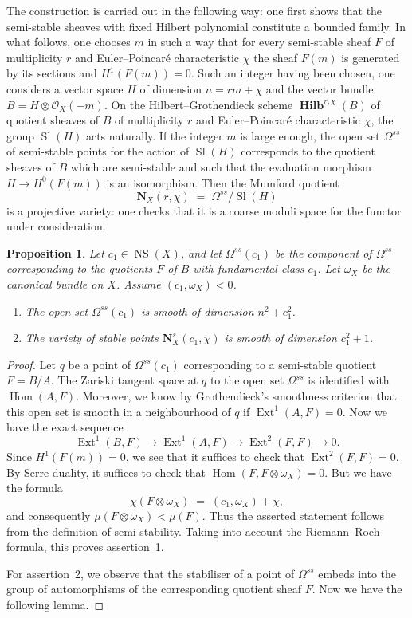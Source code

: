 \documentclass[12pt,english]{smfart}%
\theoremstyle{plain}
\newtheorem{proposition}[theorem]{Proposition}
\theoremstyle{definition}
\theoremstyle{remark}
\newcommand{\Oh}{\mathcal{O}}
\DeclareMathOperator{\Hom}{Hom}
\DeclareMathOperator{\Ext}{Ext}
\DeclareMathOperator{\NS}{NS}
\DeclareMathOperator{\Sl}{Sl}
\DeclareMathOperator{\Hilb}{\mathbf{Hilb}}
\newcommand{\origpage}[1]{\marginnote{\scriptsize\itshape p.~#1}}
\begin{document}
The construction is carried out in the following way: one first shows that the semi-stable sheaves with fixed Hilbert polynomial constitute a bounded family. In what follows, one chooses $m$ in such a way that for every semi-stable sheaf $F$ of multiplicity $r$ and Euler--Poincar\'e characteristic $\chi$ the sheaf $F(m)$ is generated by its sections and $H^{1}(F(m))=0$. Such an integer having been chosen, one considers a vector space $H$ of dimension $n=rm+\chi$ and the vector bundle $B=H\otimes\Oh_{X}(-m)$. On the Hilbert--Grothendieck scheme $\Hilb^{r,\chi}(B)$ of quotient sheaves of $B$ of multiplicity $r$ and Euler--Poincar\'e characteristic $\chi$, the group $\Sl(H)$ acts naturally.
\origpage{639}
If the integer $m$ is large enough, the open set $\Omega^{ss}$ of semi-stable points for the action of $\Sl(H)$ corresponds to the quotient sheaves of $B$ which are semi-stable and such that the evaluation morphism $H \to H^{0}(F(m))$ is an isomorphism. Then the Mumford quotient
\[
\mathbf{N}_{X}(r,\chi) \;=\; \Omega^{ss}/\Sl(H)
\]
is a projective variety: one checks that it is a coarse moduli space for the functor under consideration.

\begin{proposition}\label{prop:smooth-omega}
Let $c_{1}\in \NS(X)$, and let $\Omega^{ss}(c_{1})$ be the component of $\Omega^{ss}$ corresponding to the quotients $F$ of $B$ with fundamental class $c_{1}$. Let $\omega_{X}$ be the canonical bundle on $X$. Assume $(c_{1},\omega_{X})<0$.
\begin{enumerate}
\item The open set $\Omega^{ss}(c_{1})$ is smooth of dimension $n^{2}+c_{1}^{2}$.
\item The variety of stable points $\mathbf{N}^{s}_{X}(c_{1},\chi)$ is smooth of dimension $c_{1}^{2}+1$.
\end{enumerate}
\end{proposition}

\begin{proof}
Let $q$ be a point of $\Omega^{ss}(c_{1})$ corresponding to a semi-stable quotient $F=B/A$. The Zariski tangent space at $q$ to the open set $\Omega^{ss}$ is identified with $\Hom(A,F)$. Moreover, we know by Grothendieck's smoothness criterion that this open set is smooth in a neighbourhood of $q$ if $\Ext^{1}(A,F)=0$. Now we have the exact sequence
\[
\Ext^{1}(B,F) \longrightarrow \Ext^{1}(A,F) \longrightarrow \Ext^{2}(F,F)
\longrightarrow 0 .
\]
Since $H^{1}(F(m))=0$, we see that it suffices to check that $\Ext^{2}(F,F)=0$. By Serre duality, it suffices to check that $\Hom(F,F\otimes \omega_{X})=0$. But we have the formula
\[
\chi(F\otimes \omega_{X}) \;=\; (c_{1},\omega_{X}) + \chi ,
\]
and consequently $\mu(F\otimes\omega_{X})<\mu(F)$. Thus the asserted statement follows from the definition of semi-stability. Taking into account the Riemann--Roch formula, this proves assertion~1.

For assertion~2, we observe that the stabiliser of a point of $\Omega^{ss}$ embeds into the group of automorphisms of the corresponding quotient sheaf $F$. Now we have the following lemma.
\end{proof}
\end{document}
